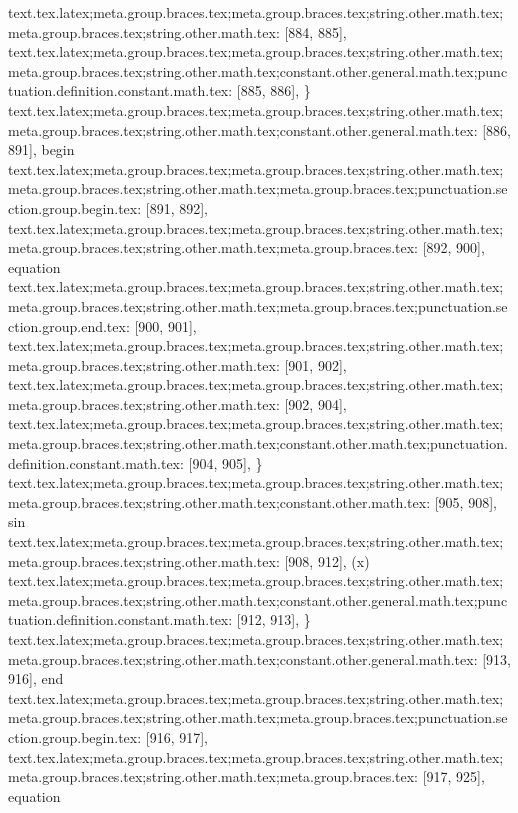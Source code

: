 {{{{{{{{{{{{{{{{{{{{{{{{{{text.tex.latex;meta.group.braces.tex;meta.group.braces.tex;string.other.math.tex;meta.group.braces.tex;string.other.math.tex: [884, 885], {
}
text.tex.latex;meta.group.braces.tex;meta.group.braces.tex;string.other.math.tex;meta.group.braces.tex;string.other.math.tex;constant.other.general.math.tex;punctuation.definition.constant.math.tex: [885, 886], {\}
text.tex.latex;meta.group.braces.tex;meta.group.braces.tex;string.other.math.tex;meta.group.braces.tex;string.other.math.tex;constant.other.general.math.tex: [886, 891], {begin}
text.tex.latex;meta.group.braces.tex;meta.group.braces.tex;string.other.math.tex;meta.group.braces.tex;string.other.math.tex;meta.group.braces.tex;punctuation.section.group.begin.tex: [891, 892], {{}
text.tex.latex;meta.group.braces.tex;meta.group.braces.tex;string.other.math.tex;meta.group.braces.tex;string.other.math.tex;meta.group.braces.tex: [892, 900], {equation}
text.tex.latex;meta.group.braces.tex;meta.group.braces.tex;string.other.math.tex;meta.group.braces.tex;string.other.math.tex;meta.group.braces.tex;punctuation.section.group.end.tex: [900, 901], {}}
text.tex.latex;meta.group.braces.tex;meta.group.braces.tex;string.other.math.tex;meta.group.braces.tex;string.other.math.tex: [901, 902], {
}
text.tex.latex;meta.group.braces.tex;meta.group.braces.tex;string.other.math.tex;meta.group.braces.tex;string.other.math.tex: [902, 904], {  }
text.tex.latex;meta.group.braces.tex;meta.group.braces.tex;string.other.math.tex;meta.group.braces.tex;string.other.math.tex;constant.other.math.tex;punctuation.definition.constant.math.tex: [904, 905], {\}
text.tex.latex;meta.group.braces.tex;meta.group.braces.tex;string.other.math.tex;meta.group.braces.tex;string.other.math.tex;constant.other.math.tex: [905, 908], {sin}
text.tex.latex;meta.group.braces.tex;meta.group.braces.tex;string.other.math.tex;meta.group.braces.tex;string.other.math.tex: [908, 912], {(x)
}
text.tex.latex;meta.group.braces.tex;meta.group.braces.tex;string.other.math.tex;meta.group.braces.tex;string.other.math.tex;constant.other.general.math.tex;punctuation.definition.constant.math.tex: [912, 913], {\}
text.tex.latex;meta.group.braces.tex;meta.group.braces.tex;string.other.math.tex;meta.group.braces.tex;string.other.math.tex;constant.other.general.math.tex: [913, 916], {end}
text.tex.latex;meta.group.braces.tex;meta.group.braces.tex;string.other.math.tex;meta.group.braces.tex;string.other.math.tex;meta.group.braces.tex;punctuation.section.group.begin.tex: [916, 917], {{}
text.tex.latex;meta.group.braces.tex;meta.group.braces.tex;string.other.math.tex;meta.group.braces.tex;string.other.math.tex;meta.group.braces.tex: [917, 925], {equation}
}}}}}}}}}}}}}}}}}}}}}}}}}}}}}}
